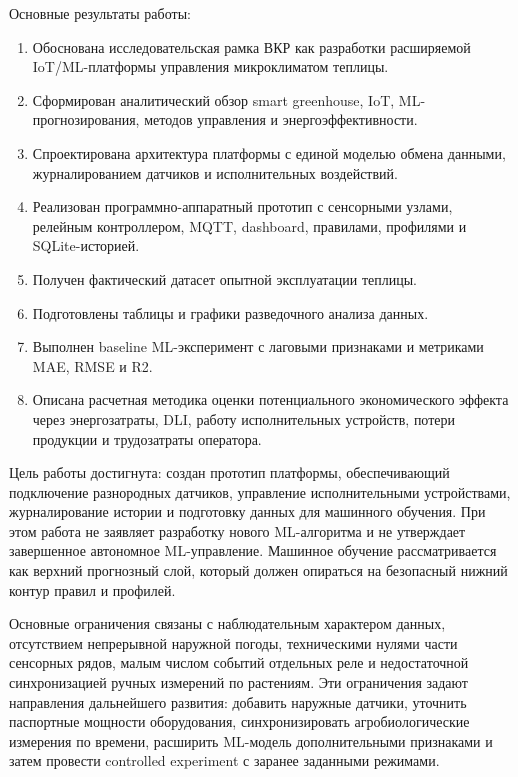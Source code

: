 \documentclass[a4paper,14pt]{extarticle}
\providecommand{\tightlist}{%
  \setlength{\itemsep}{0pt}\setlength{\parskip}{0pt}}
\begin{document}
Основные результаты работы:

\begin{enumerate}
\def\labelenumi{\arabic{enumi})}
\tightlist
\item
  Обоснована исследовательская рамка ВКР как разработки расширяемой
  IoT/ML-платформы управления микроклиматом теплицы.
\item
  Сформирован аналитический обзор smart greenhouse, IoT,
  ML-прогнозирования, методов управления и энергоэффективности.
\item
  Спроектирована архитектура платформы с единой моделью обмена данными,
  журналированием датчиков и исполнительных воздействий.
\item
  Реализован программно-аппаратный прототип с сенсорными узлами,
  релейным контроллером, MQTT, dashboard, правилами, профилями и
  SQLite-историей.
\item
  Получен фактический датасет опытной эксплуатации теплицы.
\item
  Подготовлены таблицы и графики разведочного анализа данных.
\item
  Выполнен baseline ML-эксперимент с лаговыми признаками и метриками
  MAE, RMSE и R2.
\item
  Описана расчетная методика оценки потенциального экономического
  эффекта через энергозатраты, DLI, работу исполнительных устройств,
  потери продукции и трудозатраты оператора.
\end{enumerate}

Цель работы достигнута: создан прототип платформы, обеспечивающий
подключение разнородных датчиков, управление исполнительными
устройствами, журналирование истории и подготовку данных для машинного
обучения. При этом работа не заявляет разработку нового ML-алгоритма и
не утверждает завершенное автономное ML-управление. Машинное обучение
рассматривается как верхний прогнозный слой, который должен опираться на
безопасный нижний контур правил и профилей.

Основные ограничения связаны с наблюдательным характером данных,
отсутствием непрерывной наружной погоды, техническими нулями части
сенсорных рядов, малым числом событий отдельных реле и недостаточной
синхронизацией ручных измерений по растениям. Эти ограничения задают
направления дальнейшего развития: добавить наружные датчики, уточнить
паспортные мощности оборудования, синхронизировать агробиологические
измерения по времени, расширить ML-модель дополнительными признаками и
затем провести controlled experiment с заранее заданными режимами.
\end{document}
